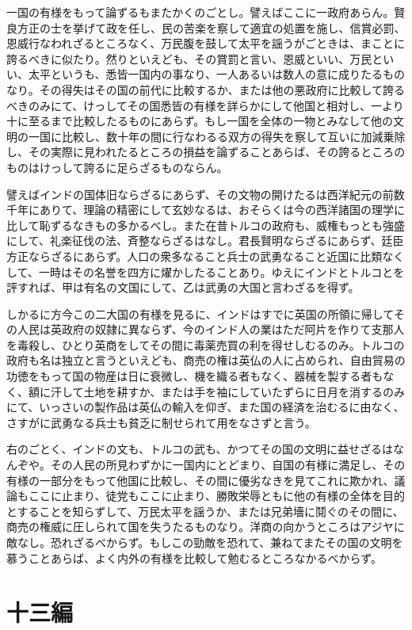 \documentclass[a4paper, platex, dvipdfmx]{jsarticle}
\begin{document}
一国の有様をもって論ずるもまたかくのごとし。譬えばここに一政府あらん。賢良方正の士を挙げて政を任し、民の苦楽を察して適宜の処置を施し、信賞必罰、恩威行なわれざるところなく、万民腹を鼓して太平を謡うがごときは、まことに誇るべきに似たり。然りといえども、その賞罰と言い、恩威といい、万民といい、太平というも、悉皆一国内の事なり、一人あるいは数人の意に成りたるものなり。その得失はその国の前代に比較するか、または他の悪政府に比較して誇るべきのみにて、けっしてその国悉皆の有様を詳らかにして他国と相対し、一より十に至るまで比較したるものにあらず。もし一国を全体の一物とみなして他の文明の一国に比較し、数十年の間に行なわるる双方の得失を察して互いに加減乗除し、その実際に見われたるところの損益を論ずることあらば、その誇るところのものはけっして誇るに足らざるものならん。

譬えばインドの国体旧ならざるにあらず、その文物の開けたるは西洋紀元の前数千年にありて、理論の精密にして玄妙なるは、おそらくは今の西洋諸国の理学に比して恥ずるなきもの多かるべし。また在昔トルコの政府も、威権もっとも強盛にして、礼楽征伐の法、斉整ならざるはなし。君長賢明ならざるにあらず、廷臣方正ならざるにあらず。人口の衆多なること兵士の武勇なること近国に比類なくして、一時はその名誉を四方に燿かしたることあり。ゆえにインドとトルコとを評すれば、甲は有名の文国にして、乙は武勇の大国と言わざるを得ず。

しかるに方今この二大国の有様を見るに、インドはすでに英国の所領に帰してその人民は英政府の奴隷に異ならず、今のインド人の業はただ阿片を作りて支那人を毒殺し、ひとり英商をしてその間に毒薬売買の利を得せしむるのみ。トルコの政府も名は独立と言うといえども、商売の権は英仏の人に占められ、自由貿易の功徳をもって国の物産は日に衰微し、機を織る者もなく、器械を製する者もなく、額に汗して土地を耕すか、または手を袖にしていたずらに日月を消するのみにて、いっさいの製作品は英仏の輸入を仰ぎ、また国の経済を治むるに由なく、さすがに武勇なる兵士も貧乏に制せられて用をなさずと言う。

右のごとく、インドの文も、トルコの武も、かつてその国の文明に益せざるはなんぞや。その人民の所見わずかに一国内にとどまり、自国の有様に満足し、その有様の一部分をもって他国に比較し、その間に優劣なきを見てこれに欺かれ、議論もここに止まり、徒党もここに止まり、勝敗栄辱ともに他の有様の全体を目的とすることを知らずして、万民太平を謡うか、または兄弟墻に鬩ぐのその間に、商売の権威に圧しられて国を失うたるものなり。洋商の向かうところはアジヤに敵なし。恐れざるべからず。もしこの勁敵を恐れて、兼ねてまたその国の文明を慕うことあらば、よく内外の有様を比較して勉むるところなかるべからず。

\section{十三編}
\end{document}
